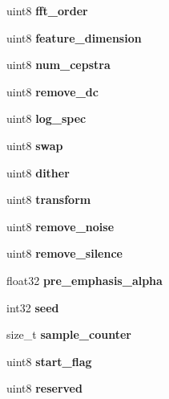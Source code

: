 \begin{DoxyCompactItemize}
\item 
uint8 {\bfseries fft\+\_\+order}\label{structfe__s_a3783552280c06207510cbe576a76d1d9}

\item 
uint8 {\bfseries feature\+\_\+dimension}\label{structfe__s_a9c876fb2d9be5f3acaad06ddebcdc4fe}

\item 
uint8 {\bfseries num\+\_\+cepstra}\label{structfe__s_a05579b3906420cddd62fdf1ded7b63ce}

\item 
uint8 {\bfseries remove\+\_\+dc}\label{structfe__s_ac575bed8a61105f4302bd27246d4c33d}

\item 
uint8 {\bfseries log\+\_\+spec}\label{structfe__s_a7d3d6513ae6b60632d14c1e1d5dfe891}

\item 
uint8 {\bfseries swap}\label{structfe__s_ab08200d2bfc6d868536d802501525179}

\item 
uint8 {\bfseries dither}\label{structfe__s_abd7b32a70dc6512134e39dd54d160689}

\item 
uint8 {\bfseries transform}\label{structfe__s_a49f2e495d938acaf5c918059e99854e2}

\item 
uint8 {\bfseries remove\+\_\+noise}\label{structfe__s_a254fc94d7868163fba6f2d8826d60fa6}

\item 
uint8 {\bfseries remove\+\_\+silence}\label{structfe__s_a8479b916c411d6d0140bf4a16eb83437}

\item 
float32 {\bfseries pre\+\_\+emphasis\+\_\+alpha}\label{structfe__s_aa7dc496e33955b7f06f83715c05ded8e}

\item 
int32 {\bfseries seed}\label{structfe__s_a0f42573b9f0ce0247181c5dd79e16b67}

\item 
size\+\_\+t {\bfseries sample\+\_\+counter}\label{structfe__s_a40c006f7494fdad56833d5fd7ccf6904}

\item 
uint8 {\bfseries start\+\_\+flag}\label{structfe__s_aa05ae3633c2b33e77a7b8b90e769176b}

\item 
uint8 {\bfseries reserved}\label{structfe__s_a18670c79bc0cd9848fdf4711c5094542}


\end{DoxyCompactItemize}
